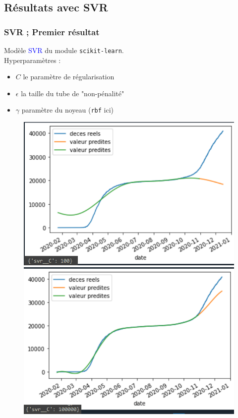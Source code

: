 \documentclass{beamer}[aspectratio = 43]
\begin{document}
\subsection{Résultats avec SVR}
\begin{frame}
	\frametitle{SVR ; Premier résultat}
	Modèle \textcolor{blue}{SVR} du module \texttt{scikit-learn}.\\
	Hyperparamètres :
	\begin{itemize}
		\item[]$C$ le paramètre de régularisation
		\item[]$\epsilon$ la taille du tube de "non-pénalité"
		\item[]$\gamma$ paramètre du noyeau (\texttt{rbf} ici)
	\end{itemize}
	\begin{figure}[h]
		\centering
		\begin{minipage}{0.5\textwidth}
			\includegraphics[scale=0.37]{svr100}
		\end{minipage}%
		\begin{minipage}{0.5\textwidth}
			\includegraphics[scale=0.37]{svr100000}

\end{minipage}
\end{figure}
\end{frame}
\end{document}
